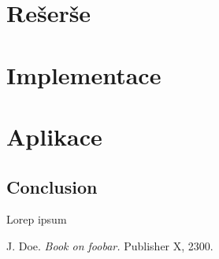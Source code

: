 \documentclass{ctuthesis}
\begin{document}
\maketitle



\part{Rešerše}



\part{Implementace}



\part{Aplikace}

\chapter{Conclusion}

Lorep ipsum \cite{doe}

\begin{thebibliography}{1}

     J. Doe. \emph{Book on foobar.} Publisher X, 2300.

\end{thebibliography}
\end{document}
